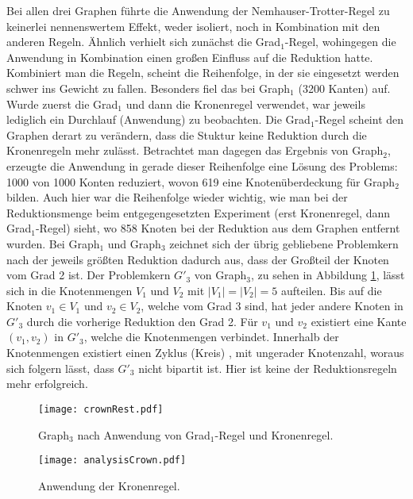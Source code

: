 Bei allen drei Graphen führte die Anwendung der Nemhauser-Trotter-Regel zu keinerlei nennenswertem Effekt, weder isoliert, noch in Kombination mit den anderen Regeln. Ähnlich verhielt sich zunächst die Grad$_{1}$-Regel, wohingegen die Anwendung in Kombination einen großen Einfluss auf die Reduktion hatte. Kombiniert man die Regeln, scheint die Reihenfolge, in der sie eingesetzt werden schwer ins Gewicht zu fallen. Besonders fiel das bei Graph$_{1}$ (3200 Kanten) auf. Wurde zuerst die Grad$_{1}$ und dann die Kronenregel verwendet, war jeweils lediglich ein Durchlauf (Anwendung) zu beobachten. Die Grad$_{1}$-Regel scheint den Graphen derart zu verändern, dass die Stuktur keine Reduktion durch die Kronenregeln mehr zulässt. Betrachtet man dagegen das Ergebnis von Graph$_{2}$, erzeugte die Anwendung in gerade dieser Reihenfolge eine Lösung des Problems: 1000 von 1000 Konten reduziert, wovon 619 eine Knotenüberdeckung für Graph$_{2}$ bilden. Auch hier war die Reihenfolge wieder wichtig, wie man bei der Reduktionsmenge beim entgegengesetzten Experiment (erst Kronenregel, dann Grad$_{1}$-Regel) sieht, wo 858 Knoten bei der Reduktion aus dem Graphen entfernt wurden. Bei Graph$_{1}$ und Graph$_{3}$ zeichnet sich der übrig gebliebene Problemkern nach der jeweils größten Reduktion dadurch aus, dass der Großteil der Knoten vom Grad 2 ist. Der Problemkern $G'_{3}$ von Graph$_{3}$, zu sehen in  Abbildung \ref{fig:crownRest}, lässt sich in die Knotenmengen $V_{1}$ und $V_{2}$  mit $|V_{1}| = |V_{2}| = 5$ aufteilen. Bis auf die Knoten $v_{1} \in V_{1}$ und $v_{2} \in V_{2}$, welche vom Grad 3 sind, hat jeder andere Knoten in  $G'_{3}$ durch die vorherige Reduktion den Grad 2. Für  $v_{1}$ und $v_{2}$ existiert eine Kante $(v_{1}, v_{2})$ in $G'_{3}$, welche die Knotenmengen verbindet. Innerhalb der Knotenmengen existiert einen Zyklus (Kreis) \cite{dummy}, mit ungerader Knotenzahl, woraus sich folgern lässt, dass $G'_{3}$ nicht bipartit ist. Hier ist keine der Reduktionsregeln mehr erfolgreich.
\begin{figure}[htb]
\centering
  	{\texttt{[image: crownRest.pdf]}}
	\caption{Graph$_{3}$ nach Anwendung von Grad$_{1}$-Regel und Kronenregel.\label{fig:crownRest}}
\centering
\end{figure}
\begin{figure}[htb]
\centering
  	{\texttt{[image: analysisCrown.pdf]}}
	\caption{Anwendung der Kronenregel.\label{fig:crown}}
\centering
\end{figure}

